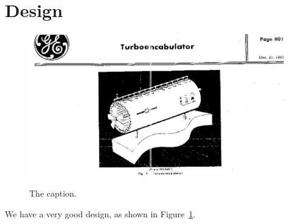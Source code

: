 \section{Design}

\begin{figure}
\includegraphics[width=\columnwidth,alt={The turboencabulator: a large cylindrical wonder-machine.}]{figures/design_diagram.png}
\caption{The caption.}
\label{fig:design_diagram}
\end{figure}
We have a very good design, as shown in Figure~\ref{fig:design_diagram}.
